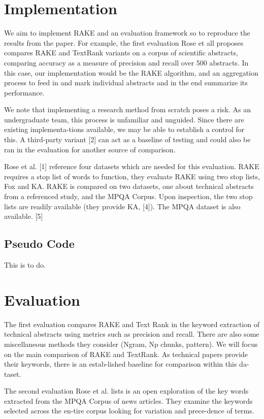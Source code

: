 \documentclass[11pt,a4paper]{article}
\begin{document}
\section{Implementation}

We aim to implement RAKE and an evaluation framework so to reproduce the results from the paper. For example, the first evaluation Rose et all proposes compares RAKE and TextRank variants on a corpus of scientific abstracts, comparing accuracy as a measure of precision and recall over 500 abstracts. In this case, our implementation would be the RAKE algorithm, and an aggregation process to feed in and mark individual abstracts and in the end summarize its performance.

We note that implementing a research method from scratch poses a risk. As an undergraduate team, this process is unfamiliar and unguided. Since there are existing implementa-tions available, we may be able to establish a control for this. A third-party variant [2] can act as a baseline of testing and could also be ran in the evaluation for another source of comparison.  

Rose et al. [1] reference four datasets which are needed for this evaluation. RAKE requires a stop list of words to function, they evaluate RAKE using two stop lists, Fox and KA. RAKE is compared on two datasets, one about technical abstracts from a referenced study, and the MPQA Corpus. Upon inspection, the two stop lists are readily available (they provide KA, [4]). The MPQA dataset is also available. [5]

\subsection {Pseudo Code}
This is to do.

\section{Evaluation}

The first evaluation compares RAKE and Text Rank in the keyword extraction of technical abstracts using metrics such as precision and recall. There are also some miscellaneous methods they consider (Ngram, Np chunks, pattern). We will focus on the main comparison of RAKE and TextRank. As technical papers provide their keywords, there is an estab-lished baseline for comparison within this da-taset.

The second evaluation Rose et al. lists is an open exploration of the key words extracted from the MPQA Corpus of news articles. They examine the keywords selected across the en-tire corpus looking for variation and prece-dence of terms.   
\end{document}
